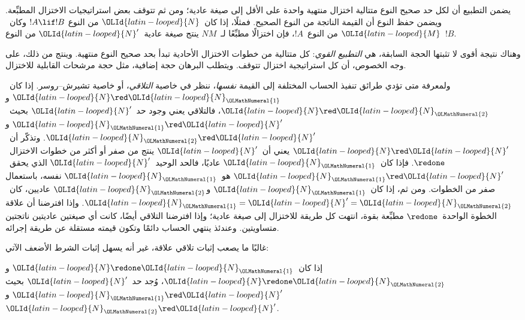 \documentclass[../../../include/open-logic-section]{subfiles}
\begin{document}
يضمن التطبيع أن لكل حد صحيح النوع متتالية اختزال منتهية واحدة على الأقل إلى
صيغة عادية؛ ومن ثم تتوقف بعض استراتيجيات الاختزال المطبِّعة. ويضمن حفظ النوع
أن القيمة الناتجة من النوع الصحيح. فمثلًا، إذا كان~$\OLId{latin-looped}{N}$ من النوع
$!A\lif !B$ وكان~$\OLId{latin-looped}{M}$ من النوع~$!A$، فإن اختزالًا مطبِّعًا لـ~$NM$ ينتج
صيغة عادية~$\OLId{latin-looped}{N}'$ من النوع~$!B$.

وهناك نتيجة أقوى لا تثبتها الحجة السابقة، هي \emph{التطبيع القوي}: كل
متتالية من خطوات الاختزال الأحادية تبدأ بحد صحيح النوع منتهية. وينتج من ذلك،
على وجه الخصوص، أن كل استراتيجية اختزال تتوقف. ويتطلب البرهان حجة إضافية،
مثل حجة مرشحات القابلية للاختزال.

ولمعرفة متى تؤدي طرائق تنفيذ الحساب المختلفة إلى القيمة \emph{نفسها}، ننظر
في خاصية \emph{التلاقي}، أو خاصية تشيرش--روسر. إذا كان~$\OLId{latin-looped}{N}\red \OLId{latin-looped}{N}_\OLMathNumeral{1}$ و
$\OLId{latin-looped}{N}\red \OLId{latin-looped}{N}_\OLMathNumeral{2}$، فالتلاقي يعني وجود حد~$\OLId{latin-looped}{N}'$ بحيث~$\OLId{latin-looped}{N}_\OLMathNumeral{1}\red \OLId{latin-looped}{N}'$ و
$\OLId{latin-looped}{N}_\OLMathNumeral{2}\red \OLId{latin-looped}{N}'$. وتذكّر أن~$\OLId{latin-looped}{N}\red \OLId{latin-looped}{N}'$ يعني أن~$\OLId{latin-looped}{N}'$ ينتج من صفر أو أكثر من
خطوات الاختزال~$\redone$. فإذا كان~$\OLId{latin-looped}{N}_\OLMathNumeral{1}$ عاديًا، فالحد الوحيد~$\OLId{latin-looped}{N}'$ الذي
يحقق~$\OLId{latin-looped}{N}_\OLMathNumeral{1}\red \OLId{latin-looped}{N}'$ هو~$\OLId{latin-looped}{N}_\OLMathNumeral{1}$ نفسه، باستعمال صفر من الخطوات. ومن ثم، إذا
كان~$\OLId{latin-looped}{N}_\OLMathNumeral{1}$ و$\OLId{latin-looped}{N}_\OLMathNumeral{2}$ عاديين، كان~$\OLId{latin-looped}{N}_\OLMathNumeral{1}=\OLId{latin-looped}{N}'=\OLId{latin-looped}{N}_\OLMathNumeral{2}$. وإذا افترضنا أن علاقة الخطوة
الواحدة~$\redone$ مطبِّعة بقوة، انتهت كل طريقة للاختزال إلى صيغة عادية؛
وإذا افترضنا التلاقي أيضًا، كانت أي صيغتين عاديتين ناتجتين متساويتين. وعندئذ
ينتهي الحساب دائمًا وتكون قيمته مستقلة عن طريقة إجرائه.

غالبًا ما يصعب إثبات تلاقي علاقة، غير أنه يسهل إثبات الشرط الأضعف الآتي:

\begin{prop}
إذا كان~$\OLId{latin-looped}{N}\redone \OLId{latin-looped}{N}_\OLMathNumeral{1}$ و$\OLId{latin-looped}{N}\redone \OLId{latin-looped}{N}_\OLMathNumeral{2}$، وُجد حد~$\OLId{latin-looped}{N}'$ بحيث
$\OLId{latin-looped}{N}_\OLMathNumeral{1}\red \OLId{latin-looped}{N}'$ و$\OLId{latin-looped}{N}_\OLMathNumeral{2}\red \OLId{latin-looped}{N}'$.
\end{prop}
\end{document}
